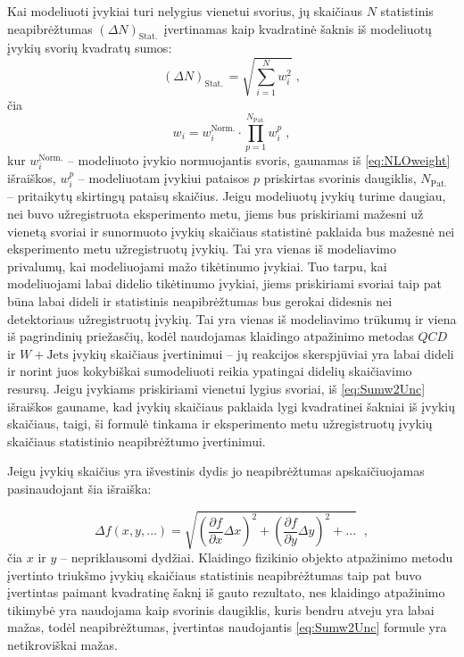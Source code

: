 \documentclass[a4paper, 12pt, oneside]{article}
\newcommand{\WJets}{W\! +\!\mathrm{Jets}}
\newcommand{\QCD}{QC\! D}
\newlength\q
\begin{document}
Kai modeliuoti įvykiai turi nelygius vienetui svorius, jų skaičiaus $N$ statistinis neapibrėžtumas $(\Delta N)_{\mathrm{Stat.\,}}$
įvertinamas kaip kvadratinė šaknis iš modeliuotų įvykių svorių kvadratų sumos:
\begin{equation}
	(\Delta N)_{\mathrm{Stat.\,}} = \sqrt{\sum_{i=1}^{N}w_{i}^{2}} \; ,
	\label{eq:Sumw2Unc}
\end{equation}
čia $$w_{i}=w_{i}^{\mathrm{Norm.}} \cdot \prod_{p=1}^{N_{\mathrm{Pat.}}}w_{i}^{p} \; ,$$
kur $w_{i}^{\mathrm{Norm.}}$ -- modeliuoto įvykio normuojantis svoris, gaunamas iš \ref{eq:NLOweight} išraiškos,
$w_{i}^{p}$ -- modeliuotam įvykiui pataisos $p$ priskirtas svorinis daugiklis, $N_{\mathrm{Pat.}}$ -- pritaikytų
skirtingų pataisų skaičius.
Jeigu modeliuotų įvykių turime daugiau, nei buvo užregistruota eksperimento metu, jiems bus priskiriami mažesni už
vienetą svoriai ir sunormuoto įvykių skaičiaus statistinė paklaida bus mažesnė nei eksperimento metu užregistruotų
įvykių.
Tai yra vienas iš modeliavimo privalumų, kai modeliuojami mažo tikėtinumo įvykiai.
Tuo tarpu, kai modeliuojami labai didelio tikėtinumo įvykiai, jiems priskiriami svoriai taip pat būna labai dideli
ir statistinis neapibrėžtumas bus gerokai didesnis nei detektoriaus užregistruotų įvykių.
Tai yra vienas iš modeliavimo trūkumų ir viena iš pagrindinių priežasčių, kodėl naudojamas klaidingo atpažinimo metodas
$\QCD$ ir $\WJets$ įvykių skaičiaus įvertinimui -- jų reakcijos skerspjūviai yra labai dideli ir norint juos kokybiškai
sumodeliuoti reikia ypatingai didelių skaičiavimo resursų.
Jeigu įvykiams priskiriami vienetui lygius svoriai, iš \ref{eq:Sumw2Unc} išraiškos gauname, kad įvykių
skaičiaus paklaida lygi kvadratinei šakniai iš įvykių skaičiaus, taigi, ši formulė tinkama ir eksperimento
metu užregistruotų įvykių skaičiaus statistinio neapibrėžtumo įvertinimui.

Jeigu įvykių skaičius yra išvestinis dydis jo neapibrėžtumas apskaičiuojamas pasinaudojant šia išraiška:

\begin{equation}
	\Delta f(x, y, ...) =
	\sqrt{ \left( \frac{\partial f}{\partial x} \Delta x \right)^{2} +
	\left( \frac{\partial f}{\partial y} \Delta y \right)^{2} + ... } \;\; \mathrm{,}
	\label{eq:DerUnc}
\end{equation}
čia $x$ ir $y$ -- nepriklausomi dydžiai.
Klaidingo fizikinio objekto atpažinimo metodu įvertinto triukšmo įvykių skaičiaus statistinis neapibrėžtumas taip
pat buvo įvertintas paimant kvadratinę šaknį iš gauto rezultato, nes klaidingo atpažinimo tikimybė yra naudojama
kaip svorinis daugiklis, kuris bendru atveju yra labai mažas, todėl neapibrėžtumas, įvertintas naudojantis
\ref{eq:Sumw2Unc} formule yra netikroviškai mažas.
\end{document}
